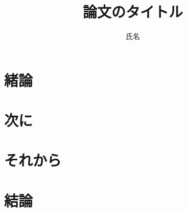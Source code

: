\documentclass[a4j,10pt,twocolumn]{../styles/utf8/abstract}
\title{論文のタイトル}	%
\author{氏名} 		%
\begin{document}
\absttitle 		%

\section{緒論}

\section{次に}

\section{それから}

\section{結論}

%
%
\begin{thebibliography}{1}
\bibitem{}
\end{thebibliography}
\newpage
\pagebreak
\end{document}
